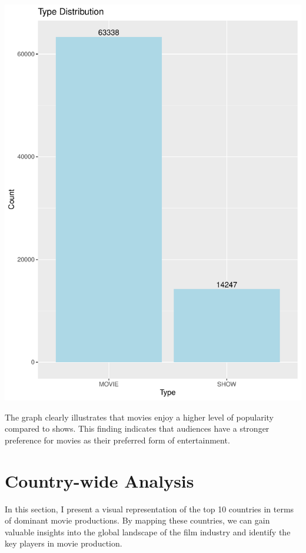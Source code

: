 \documentclass[11pt,preprint, authoryear]{elsarticle}
\numberwithin{equation}{section}
\numberwithin{figure}{section}
\numberwithin{table}{section}
\begin{document}
\includegraphics{Question4_files/figure-latex/unnamed-chunk-2-1.pdf}

The graph clearly illustrates that movies enjoy a higher level of
popularity compared to shows. This finding indicates that audiences have
a stronger preference for movies as their preferred form of
entertainment.

\hypertarget{country-wide-analysis}{%
\section{Country-wide Analysis}\label{country-wide-analysis}}

In this section, I present a visual representation of the top 10
countries in terms of dominant movie productions. By mapping these
countries, we can gain valuable insights into the global landscape of
the film industry and identify the key players in movie production.
\end{document}
